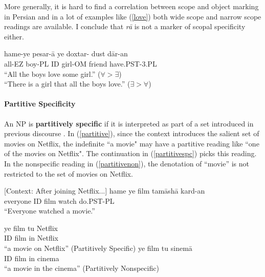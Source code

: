 \documentclass[12pt]{article}
\begin{document}
More generally, it is hard to find a correlation between scope and object marking in Persian and in a lot of examples like (\ref{love}) both wide scope and narrow scope readings are available. I conclude that \emph{r\={a}} is not a marker of scopal specificity either.

    	\begin {exe}
		\ex \label{love} \gll	hame-ye pesar-\={a} {\color {red}ye} doxtar-	dust d\={a}r-an\\
			all-{\scriptsize EZ}	boy-{\scriptsize PL}	{\scriptsize ID} girl-{\scriptsize OM}	friend	have.{\scriptsize PST-3.PL}\\
			``All the boys love some girl.'' ($\forall > \exists$)\\
			``There is a girl that all the boys love.'' ($\exists > \forall$)
    	\end {exe}

\paragraph {Partitive Specificity}

An NP is \textbf{partitively specific} if it is interpreted as part of a set introduced in previous discourse \citep{encc1991semantics}. In (\ref {partitive}), since the context introduces the salient set of movies on Netflix, the indefinite ``a movie" may have a partitive reading like ``one of the movies on Netflix". The continuation in (\ref{partitivespc}) picks this reading. In the nonspecific reading in (\ref {partitivenon}), the denotation of ``movie'' is not restricted to the set of movies on Netflix.

	\begin {exe}
		\ex	\label {partitive}{\footnotesize[Context: After joining Netflix...]} \gll	hame	ye film	tam\={a}sh\={a} kard-an\\
    			everyone {\scriptsize ID}	film watch	do{\scriptsize .PST-PL}\\
    		\glt 	``Everyone watched a movie.'' \begin {xlist}
			\ex \label {partitivespc} \gll	ye film tu Netflix\\
    			{\scriptsize ID}	film in Netflix\\
    		\glt 	``a movie on Netflix'' (Partitively Specific)
			\ex \label {partitivenon} \gll	ye film tu sinem\={a}\\
    			{\scriptsize ID}	film in cinema\\
    		\glt 	``a movie in the cinema'' (Partitively Nonspecific)		\end {xlist}
	\end {exe}
\end{document}
